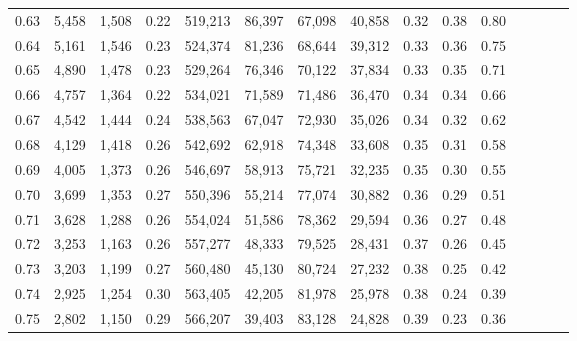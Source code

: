 \begin{tabular}{rrrcrrrrrrrrrrr}
0.63 &   5,458 &  1,508 &                                       0.22 &  519,213 &   86,397 &   67,098 &   40,858 &  0.32 &  0.38 &                         0.80 \\
0.64 &   5,161 &  1,546 &                                       0.23 &  524,374 &   81,236 &   68,644 &   39,312 &  0.33 &  0.36 &                         0.75 \\
0.65 &   4,890 &  1,478 &                                       0.23 &  529,264 &   76,346 &   70,122 &   37,834 &  0.33 &  0.35 &                         0.71 \\
0.66 &   4,757 &  1,364 &                                       0.22 &  534,021 &   71,589 &   71,486 &   36,470 &  0.34 &  0.34 &                         0.66 \\
0.67 &   4,542 &  1,444 &                                       0.24 &  538,563 &   67,047 &   72,930 &   35,026 &  0.34 &  0.32 &                         0.62 \\
0.68 &   4,129 &  1,418 &                                       0.26 &  542,692 &   62,918 &   74,348 &   33,608 &  0.35 &  0.31 &                         0.58 \\
0.69 &   4,005 &  1,373 &                                       0.26 &  546,697 &   58,913 &   75,721 &   32,235 &  0.35 &  0.30 &                         0.55 \\
0.70 &   3,699 &  1,353 &                                       0.27 &  550,396 &   55,214 &   77,074 &   30,882 &  0.36 &  0.29 &                         0.51 \\
0.71 &   3,628 &  1,288 &                                       0.26 &  554,024 &   51,586 &   78,362 &   29,594 &  0.36 &  0.27 &                         0.48 \\
0.72 &   3,253 &  1,163 &                                       0.26 &  557,277 &   48,333 &   79,525 &   28,431 &  0.37 &  0.26 &                         0.45 \\
0.73 &   3,203 &  1,199 &                                       0.27 &  560,480 &   45,130 &   80,724 &   27,232 &  0.38 &  0.25 &                         0.42 \\
0.74 &   2,925 &  1,254 &                                       0.30 &  563,405 &   42,205 &   81,978 &   25,978 &  0.38 &  0.24 &                         0.39 \\
0.75 &   2,802 &  1,150 &                                       0.29 &  566,207 &   39,403 &   83,128 &   24,828 &  0.39 &  0.23 &                         0.36 \\

\end{tabular}
